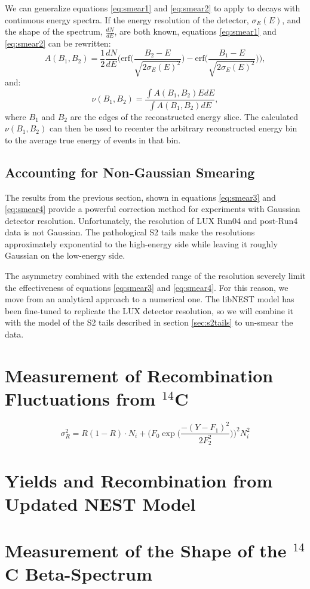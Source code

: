 We can generalize equations \ref{eq:smear1} and \ref{eq:smear2} to apply to decays with continuous energy spectra. If the energy resolution of the detector, $\sigma_E(E)$, and the shape of the spectrum, $\frac{dN}{dE}$, are both known, equations \ref{eq:smear1} and \ref{eq:smear2} can be rewritten:
\begin{equation}\label{eq:smear3}
A(B_1,B_2)=\frac{1}{2}\frac{dN}{dE} \Bigg(\text{erf} \bigg(\frac{B_2-E}{\sqrt{2\sigma_E(E)^2}}\bigg)-\text{erf}\bigg(\frac{B_1-E}{\sqrt{2\sigma_E(E)^2}}\bigg)\Bigg),
\end{equation}
and:
\begin{equation}\label{eq:smear4}
\nu(B_1,B_2)=\frac{\int A(B_1,B_2)EdE}{\int A(B_1,B_2)dE},
\end{equation}
where $B_1$ and $B_2$ are the edges of the reconstructed energy slice. The calculated $\nu(B_1,B_2)$ can then be used to recenter the arbitrary reconstructed energy bin to the average true energy of events in that bin.

\subsection{Accounting for Non-Gaussian Smearing }
The results from the previous section, shown in equations \ref{eq:smear3} and \ref{eq:smear4} provide a powerful correction method for experiments with Gaussian detector resolution. Unfortunately, the resolution of LUX Run04 and post-Run4 data is not Gaussian. The pathological S2 tails make the resolutions approximately exponential to the high-energy side while leaving it roughly Gaussian on the low-energy side. 

The asymmetry combined with the extended range of the resolution severely limit the effectiveness of equations \ref{eq:smear3} and \ref{eq:smear4}. For this reason, we move from an analytical approach to a numerical one. The libNEST model has been fine-tuned to replicate the LUX detector resolution, so we will combine it with the model of the S2 tails described in section \ref{sec:s2tails} to un-smear the data. 


\section{Measurement of Recombination Fluctuations from $^{14}$C}

\begin{equation}
\sigma_{R}^2=R(1-R)\cdot N_i +\bigg(F_0\exp \Big(\frac{-(Y-F_1)^2}{2F_2^2}\Big)\bigg)^2N_i^2
\end{equation}


\section{Yields and Recombination from Updated NEST Model}


\section{Measurement of the Shape of the $^{14}$C Beta-Spectrum}


















